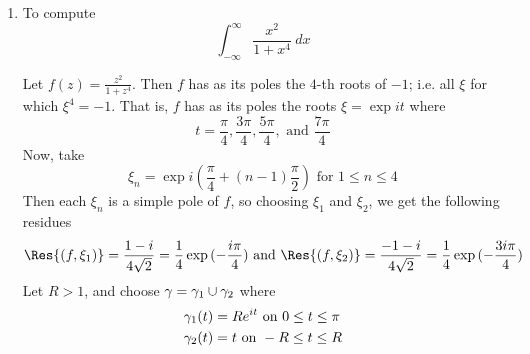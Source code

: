 \begin{example}\label{example_5.2}
    \begin{enumerate}
    \item[(1)] To compute
        \begin{equation*}
            \int_{-\infty}^\infty{\frac{x^2}{1+x^4} \ dx}
        \end{equation*}

        Let $f(z)=\frac{z^2}{1+z^4}$. Then $f$ has as its poles the $4$-th roots
        of  $-1$; i.e. all $\xi$ for which $\xi^4=-1$. That is,  $f$ has as its
        poles the roots  $\xi=\exp{it}$ where
        \begin{equation*}
            t=\frac{\pi}{4}, \frac{3\pi}{4}, \frac{5\pi}{4}, \text{ and } \frac{7\pi}{4}
        \end{equation*}
        Now, take
        \begin{equation*}
            \xi_n=\exp{i(\frac{\pi}{4}+(n-1)\frac{\pi}{2})} \text{ for } 1 \leq
            n \leq 4
        \end{equation*}
        Then each $\xi_n$ is a simple pole of  $f$, so choosing $\xi_1$ and
        $\xi_2$, we get the following residues
        \begin{equation*}
            \Res{(f,\xi_1)}=\frac{1-i}{4\sqrt{2}}=\frac{1}{4}\exp{(-\frac{i\pi}{4})}
            \text{ and }
            \Res{(f,\xi_2)}=\frac{-1-i}{4\sqrt{2}}=\frac{1}{4}\exp{(-\frac{3i\pi}{4})}
        \end{equation*}
        Let $R>1$, and choose  $\gamma=\gamma_1 \cup \gamma_2$ where
        \begin{align*}
            \gamma_1(t) &=  Re^{it} \text{ on } 0 \leq t \leq \pi  \\
            \gamma_2(t) &=  t   \text{ on } -R \leq t \leq R    \\
        \end{align*}


\end{enumerate}
\end{example}
